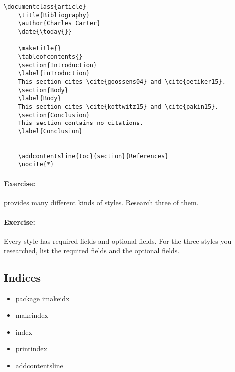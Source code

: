         \begin{verbatim}
\documentclass{article}
    \title{Bibliography}
    \author{Charles Carter}
    \date{\today{}}
 
    \maketitle{}
    \tableofcontents{}
    \section{Introduction}
    \label{inTroduction}
    This section cites \cite{goossens04} and \cite{oetiker15}.
    \section{Body}
    \label{Body}
    This section cites \cite{kottwitz15} and \cite{pakin15}.
    \section{Conclusion}
    This section contains no citations.
    \label{Conclusion}
        
    
    \addcontentsline{toc}{section}{References}
    \nocite{*}

        \end{verbatim}

        \paragraph{Exercise:} \bib provides many different kinds of styles. Research three of them.

        \paragraph{Exercise:} Every style has required fields and optional fields. For the three styles you researched, list the required fields and the optional fields.

    \subsection{Indices}
    \label{Indices}
        
        \begin{cmd}
            \begin{itemize}
                \item{package imakeidx}
                \item{makeindex}
                \item{index}
                \item{printindex}
                \item{addcontentsline}
            \end{itemize}
        \end{cmd}

